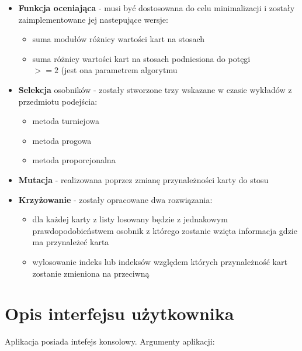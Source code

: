 \documentclass[12pt]{article}
\begin{document}
\begin{itemize}
	\item{\textbf{Funkcja oceniająca} - musi być dostosowana do celu minimalizacji i zostały zaimplementowane jej nastepujące wersje:
		\begin{itemize}
			\item{suma modułów różnicy wartości kart na stosach} 
			\item{suma różnicy wartości kart na stosach podniesiona do potęgi \\ $>=2$ (jest ona parametrem algorytmu} 
		\end{itemize} 
	}
	\item{\textbf{Selekcja} osobników - zostały stworzone trzy wskazane w czasie wykładów z przedmiotu podejścia:
		\begin{itemize}
			\item{metoda turniejowa}
			\item{metoda progowa}
			\item{metoda proporcjonalna}
		\end{itemize}
	}
	\item{\textbf{Mutacja} - realizowana poprzez zmianę przynależności karty do stosu}
	\item{\textbf{Krzyżowanie} - zostały opracowane dwa rozwiązania:
		\begin{itemize}
			\item{dla każdej karty z listy losowany będzie z jednakowym prawdopodobieństwem osobnik z którego zostanie wzięta informacja gdzie ma przynależeć karta}
			\item{wylosowanie indeks lub indeksów względem których przynależność kart zostanie zmieniona na przeciwną}
		\end{itemize}			
		} 
\end{itemize}

\section{Opis interfejsu użytkownika}
Aplikacja posiada intefejs konsolowy. Argumenty aplikacji:
\end{document}
